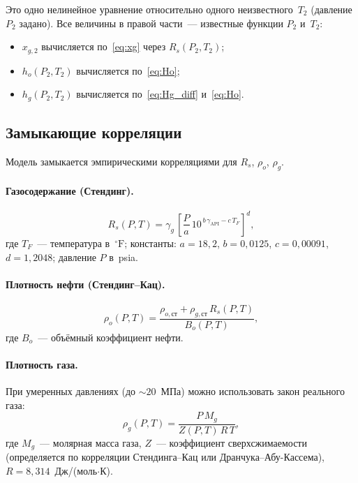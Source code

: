\documentclass[12pt,a4paper]{article}
\begin{document}
Это одно нелинейное уравнение относительно одного неизвестного~$T_2$
(давление~$P_2$ задано). Все величины в правой части~--- известные функции
$P_2$ и~$T_2$:
\begin{itemize}[nosep]
  \item $x_{g,2}$ вычисляется по~\eqref{eq:xg} через $R_s(P_2, T_2)$;
  \item $h_o(P_2,T_2)$ вычисляется по~\eqref{eq:Ho};
  \item $h_g(P_2,T_2)$ вычисляется по~\eqref{eq:Hg_diff} и~\eqref{eq:Ho}.
\end{itemize}

\subsection{Замыкающие корреляции}

Модель замыкается эмпирическими корреляциями для $R_s$, $\rho_o$, $\rho_g$.

\paragraph{Газосодержание (Стендинг).}
\begin{equation}\label{eq:standing_full}
  R_s(P,T) = \gamma_g\,\left[\frac{P}{a}\,
    10^{\,b\,\gamma_{\mathrm{API}} - c\,T_F}\right]^d,
\end{equation}
где $T_F$~--- температура в~${}^\circ\mathrm{F}$; константы:
$a = 18{,}2$, $b = 0{,}0125$, $c = 0{,}00091$, $d = 1{,}2048$;
давление $P$ в~psia.

\paragraph{Плотность нефти (Стендинг--Кац).}
\begin{equation}\label{eq:rho_o}
  \rho_o(P,T) = \frac{\rho_{o,\text{ст}} + \rho_{g,\text{ст}}\,R_s(P,T)}{B_o(P,T)},
\end{equation}
где $B_o$~--- объёмный коэффициент нефти.

\paragraph{Плотность газа.}
При умеренных давлениях (до ${\sim}20$~МПа) можно использовать закон
реального газа:
\begin{equation}\label{eq:rho_g}
  \rho_g(P,T) = \frac{P\,M_g}{Z(P,T)\,R\,T},
\end{equation}
где $M_g$~--- молярная масса газа, $Z$~--- коэффициент сверхсжимаемости
(определяется по корреляции Стендинга--Кац или Дранчука--Абу-Кассема),
$R = 8{,}314$~Дж/(моль$\cdot$К).
\end{document}
